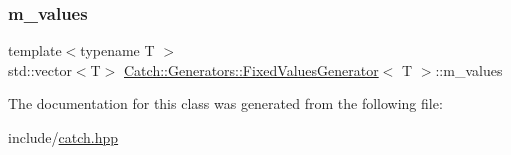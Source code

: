 \mbox{\label{class_catch_1_1_generators_1_1_fixed_values_generator_a591837f944b435858bc3b9fa73502ee6}} 
\subsubsection{\texorpdfstring{m\_values}{m\_values}}
{\footnotesize\ttfamily template$<$typename T $>$ \\
std\+::vector$<$T$>$ \mbox{\hyperlink{class_catch_1_1_generators_1_1_fixed_values_generator}{Catch\+::\+Generators\+::\+Fixed\+Values\+Generator}}$<$ T $>$\+::m\+\_\+values\hspace{0.3cm}{\ttfamily [private]}}



The documentation for this class was generated from the following file\+:\begin{DoxyCompactItemize}
\item 
include/\mbox{\hyperlink{catch_8hpp}{catch.\+hpp}}\end{DoxyCompactItemize}
